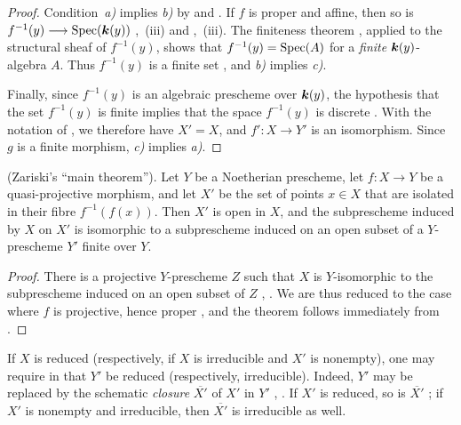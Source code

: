 \begin{proof}
Condition~\emph{a)} implies \emph{b)} by  and
.  If $f$ is proper and affine, then so is $f^{-1}(y)\longrightarrow\operatorname{Spec}(\boldsymbol{k}(y))$
,~(iii) and ,~(iii).  The finiteness theorem
, applied to the structural sheaf of $f^{-1}(y)$,
shows that $f^{-1}(y)=\operatorname{Spec}(A)$ for a \emph{finite}
$\boldsymbol{k}(y)$-algebra $A$.  Thus $f^{-1}(y)$ is a finite set
, and \emph{b)} implies \emph{c)}.

Finally, since $f^{-1}(y)$ is an algebraic prescheme over $\boldsymbol{k}(y)$,
the hypothesis that the set $f^{-1}(y)$ is finite implies that the
space $f^{-1}(y)$ is discrete .  With the notation of
, we therefore have $X'=X$, and
$f':X\to Y'$ is an isomorphism.  Since $g$ is a finite morphism, \emph{c)} implies
\emph{a)}.
\end{proof}

\begin{theorem}[4.4.3]
\label{III.4.4.3}
\textnormal{(Zariski's ``main theorem'').}
Let $Y$ be a Noetherian prescheme, let $f:X\to Y$ be a
quasi-projective morphism, and let $X'$ be the set of points $x\in X$
that are isolated in their fibre $f^{-1}(f(x))$.  Then $X'$ is open
in $X$, and the subprescheme induced by $X$ on $X'$ is isomorphic to
a subprescheme induced on an open subset of a $Y$-prescheme $Y'$
finite over $Y$.
\end{theorem}

\begin{proof}
There is a projective $Y$-prescheme $Z$ such that $X$ is
$Y$-isomorphic to the subprescheme induced on an open subset of $Z$
, .  We are thus reduced to
the case where $f$ is projective, hence proper
, and the theorem follows immediately from
.
\end{proof}

\begin{remark}[4.4.4]
\label{III.4.4.4}
If $X$ is reduced (respectively, if $X$ is irreducible and $X'$ is
nonempty), one may require in  that $Y'$ be reduced
(respectively, irreducible).  Indeed, $Y'$ may be replaced by the
schematic \emph{closure} $\overline{X'}$ of $X'$ in $Y'$
, .  If $X'$ is reduced, so is
$\overline{X'}$ ; if $X'$ is nonempty and
irreducible, then $\overline{X'}$ is irreducible as well.
\end{remark}

